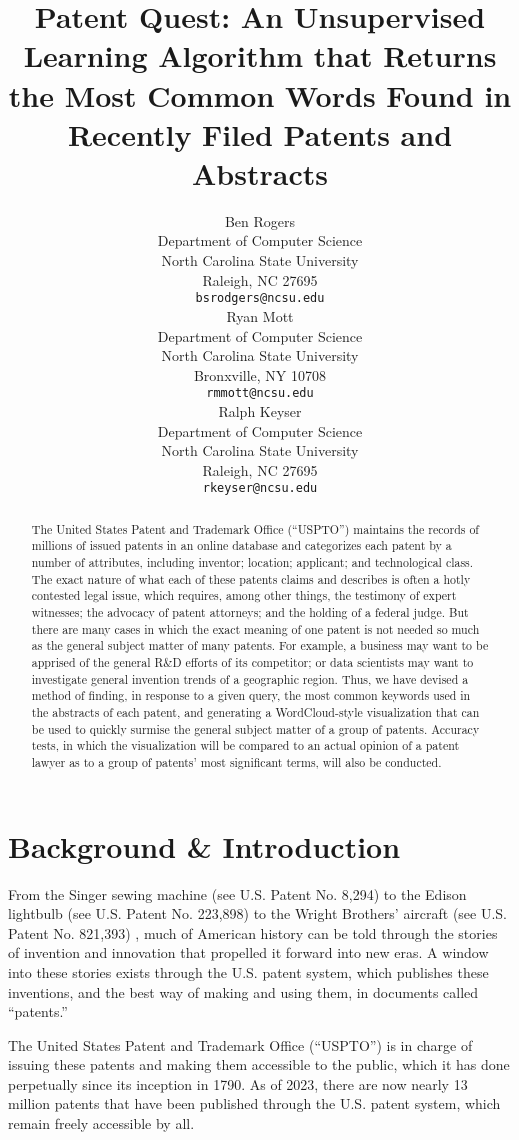 \documentclass{article}
\title{Patent Quest: An Unsupervised Learning Algorithm that Returns the Most Common Words Found in Recently Filed Patents and Abstracts}
\author{%
  Ben Rogers\\
  Department of Computer Science\\
  North Carolina State University\\
  Raleigh, NC 27695 \\
  \texttt{bsrodgers@ncsu.edu} \\
  \And
  Ryan Mott \\
  Department of Computer Science \\
  North Carolina State University \\
  Bronxville, NY 10708 \\
  \texttt{rmmott@ncsu.edu} \\
  \And
  Ralph Keyser \\
  Department of Computer Science \\
  North Carolina State University \\
  Raleigh, NC 27695 \\
  \texttt{rkeyser@ncsu.edu} \\
}
\begin{document}
\maketitle

\begin{abstract}
 The United States Patent and Trademark Office (“USPTO”) maintains the records of millions of issued patents in an online database and categorizes each patent by a number of attributes, including inventor; location; applicant; and technological class.   The exact nature of what each of these patents claims and describes is often a hotly contested legal issue, which requires, among other things, the testimony of expert witnesses; the advocacy of patent attorneys; and the holding of a federal judge.  But there are many cases in which the exact meaning of one patent is not needed so much as the general subject matter of many patents.  For example, a business may want to be apprised of the general R\&D efforts of its competitor; or data scientists may want to investigate general invention trends of a geographic region.  Thus, we have devised a method of finding, in response to a given query, the most common keywords used in the abstracts of each patent, and generating a WordCloud-style visualization that can be used to quickly surmise the general subject matter of a group of patents.  Accuracy tests, in which the visualization will be compared to an actual opinion of a patent lawyer as to a group of patents’ most significant terms, will also be conducted.
\end{abstract}

\section{Background \& Introduction}
\label{background}

From the Singer sewing machine (see U.S. Patent No. 8,294) to the Edison lightbulb (see U.S. Patent No. 223,898) to the Wright Brothers’ aircraft (see U.S. Patent No. 821,393) , much of American history can be told through the stories of invention and innovation that propelled it forward into new eras.  A window into these stories exists through the U.S. patent system, which publishes these inventions, and the best way of making and using them, in documents called “patents.”  

The United States Patent and Trademark Office (“USPTO”) is in charge of issuing these patents and making them accessible to the public, which it has done perpetually since its inception in 1790.  As of 2023, there are now nearly 13 million patents that have been published through the U.S. patent system, which remain freely accessible by all. 
\end{document}

